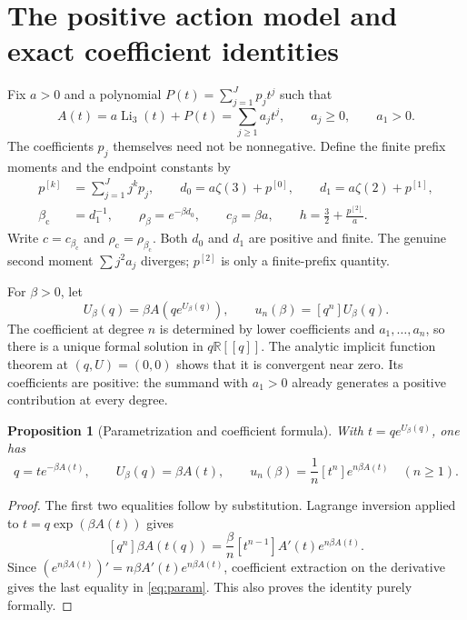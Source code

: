 \documentclass[11pt,a4paper]{article}
\numberwithin{equation}{section}
\newtheorem{proposition}[theorem]{Proposition}
\theoremstyle{definition}
\theoremstyle{remark}
\DeclareMathOperator{\Li}{Li}
\newcommand{\R}{\mathbb R}
\newcommand{\bc}{\beta_{\mathrm c}}
\newcommand{\rhoc}{\rho_{\mathrm c}}
\begin{document}
\section{The positive action model and exact coefficient identities}
\label{sec:model}

Fix $a>0$ and a polynomial $P(t)=\sum_{j=1}^Jp_jt^j$ such that
\begin{equation}\label{eq:A}
 A(t)=a\Li_3(t)+P(t)=\sum_{j\ge1}a_jt^j,
 \qquad a_j\ge0,\qquad a_1>0.
\end{equation}
The coefficients $p_j$ themselves need not be nonnegative. Define the finite
prefix moments and the endpoint constants by
\begin{align}
 p^{[k]}&=\sum_{j=1}^J j^kp_j,\qquad
 d_0=a\zeta(3)+p^{[0]},\qquad d_1=a\zeta(2)+p^{[1]},\label{eq:moments}\\
 \bc&=d_1^{-1},\qquad \rho_\beta=e^{-\beta d_0},\qquad
 c_\beta=\beta a,\qquad h=\frac32+\frac{p^{[2]}}a.\label{eq:constants}
\end{align}
Write $c=c_{\bc}$ and $\rhoc=\rho_{\bc}$. Both $d_0$ and $d_1$ are
positive and finite. The genuine second moment $\sum j^2a_j$ diverges;
$p^{[2]}$ is only a finite-prefix quantity.

For $\beta>0$, let
\begin{equation}\label{eq:feedback}
 U_\beta(q)=\beta A(qe^{U_\beta(q)}),\qquad
 u_n(\beta)=[q^n]U_\beta(q).
\end{equation}
The coefficient at degree $n$ is determined by lower coefficients and
$a_1,\ldots,a_n$, so there is a unique formal solution in $q\R[[q]]$.
The analytic implicit function theorem at $(q,U)=(0,0)$ shows that it is
convergent near zero. Its coefficients are positive: the summand with
$a_1>0$ already generates a positive contribution at every degree.

\begin{proposition}[Parametrization and coefficient formula]
\label{prop:exact}
With $t=qe^{U_\beta(q)}$, one has
\begin{equation}\label{eq:param}
 q=t e^{-\beta A(t)},\qquad U_\beta(q)=\beta A(t),\qquad
 u_n(\beta)=\frac1n[t^n]e^{n\beta A(t)}\quad(n\ge1).
\end{equation}
\end{proposition}
\begin{proof}
The first two equalities follow by substitution. Lagrange inversion applied
to $t=q\exp(\beta A(t))$ gives
\[
 [q^n]\beta A(t(q))
 =\frac\beta n[t^{n-1}]A'(t)e^{n\beta A(t)}.
\]
Since $(e^{n\beta A(t)})'=n\beta A'(t)e^{n\beta A(t)}$, coefficient
extraction on the derivative gives the last equality in \eqref{eq:param}.
This also proves the identity purely formally.
\end{proof}
\end{document}

